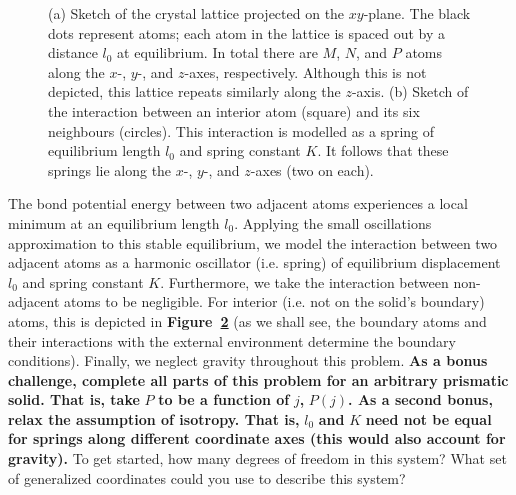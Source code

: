 \documentclass[letterpaper,12pt]{article}
\begin{document}
\begin{flushleft}
\begin{figure}[h]
\begin{subfigure}[b]{0.3\textwidth}
            \caption{}
            \label{fig:I3}
        \end{subfigure}
        \caption{(a) Sketch of the crystal lattice projected on the $xy$-plane. The black dots represent atoms; each atom in the lattice is spaced out by a distance $l_0$ at equilibrium. In total there are $M$, $N$, and $P$ atoms along the $x$-, $y$-, and $z$-axes, respectively. Although this is not depicted, this lattice repeats similarly along the $z$-axis. (b) Sketch of the interaction between an interior atom (square) and its six neighbours (circles). This interaction is modelled as a spring of equilibrium length $l_0$ and spring constant $K$. It follows that these springs lie along the $x$-, $y$-, and $z$-axes (two on each).}
    \end{figure}
    The bond potential energy between two adjacent atoms experiences a local minimum at an equilibrium length $l_0$. Applying the small oscillations approximation to this stable equilibrium, we model the interaction between two adjacent atoms as a harmonic oscillator (i.e. spring) of equilibrium displacement $l_0$ and spring constant $K$. Furthermore, we take the interaction between non-adjacent atoms to be negligible. For interior (i.e. not on the solid's boundary) atoms, this is depicted in \textbf{Figure~\ref{fig:I3}} (as we shall see, the boundary atoms and their interactions with the external environment determine the boundary conditions). Finally, we neglect gravity throughout this problem.\newline\newline
    \textbf{As a bonus challenge, complete all parts of this problem for an arbitrary prismatic solid. That is, take} $P$ \textbf{to be a function of} $j$\textbf{,} $P(j)$\textbf{. As a second bonus, relax the assumption of isotropy. That is,} $l_0$ \textbf{and} $K$ \textbf{need not be equal for springs along different coordinate axes (this would also account for gravity).}\newline\newline
    To get started, how many degrees of freedom in this system? What set of generalized coordinates could you use to describe this system?


\end{flushleft}
\end{document}
